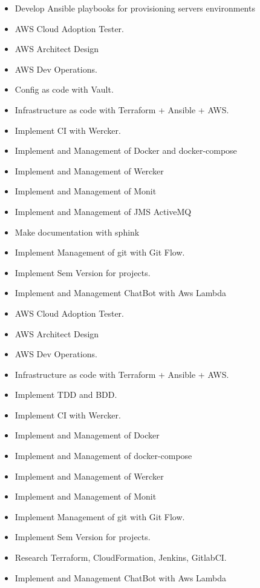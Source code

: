 \documentclass[10pt,a4paper]{altacv}
\begin{document}
\begin{itemize}
  \item Develop Ansible playbooks for provisioning servers environments
  \item AWS Cloud Adoption Tester.
  \item AWS Architect Design
  \item AWS Dev Operations.
  \item Config as code with Vault.
  \item Infrastructure as code with Terraform + Ansible + AWS.
  \item Implement CI with Wercker.
  \item Implement and Management of Docker and docker-compose
  \item Implement and Management of Wercker
  \item Implement and Management of Monit
  \item Implement and Management of JMS ActiveMQ
  \item Make documentation with sphink
  \item Implement Management of git with Git Flow.
  \item Implement Sem Version for projects.
  \item Implement and Management ChatBot with Aws Lambda
\end{itemize}

\divider

\begin{itemize}
  \item AWS Cloud Adoption Tester.
  \item AWS Architect Design
  \item AWS Dev Operations.
  \item Infrastructure as code with Terraform + Ansible + AWS.
  \item Implement TDD and BDD.
  \item Implement CI with Wercker.
  \item Implement and Management of Docker
  \item Implement and Management of docker-compose
  \item Implement and Management of Wercker
  \item Implement and Management of Monit
  \item Implement Management of git with Git Flow.
  \item Implement Sem Version for projects.
  \item Research Terraform, CloudFormation, Jenkins, GitlabCI.
  \item Implement and Management ChatBot with Aws Lambda
\end{itemize}
\end{document}
